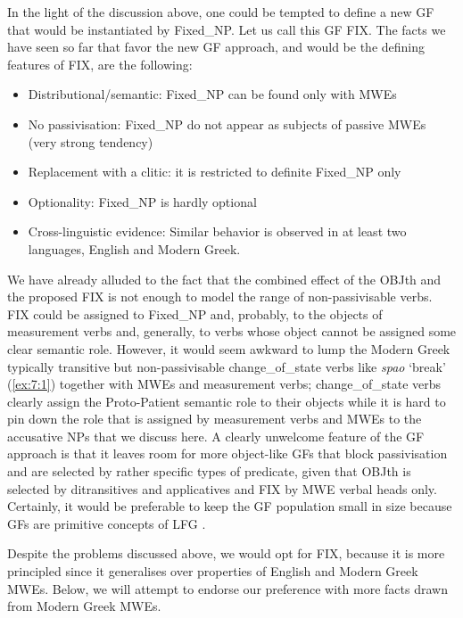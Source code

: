 \documentclass[output=paper]{langsci/langscibook}
\begin{document}
In the light of the discussion above, one could be tempted to define a new GF that would be instantiated by Fixed\_NP. Let us call this GF FIX. The facts we have seen so far that favor the new GF approach, and would be the defining features of FIX, are the following: 

\begin{itemize}
\item Distributional/semantic: Fixed\_NP can be found only with MWEs 
\item No passivisation: Fixed\_NP do not appear as subjects of passive MWEs (very strong tendency)
\item Replacement with a clitic: it is restricted to definite Fixed\_NP only
\item Optionality: Fixed\_NP is hardly optional
\item Cross-linguistic evidence: Similar behavior is observed in at least two languages, English and Modern Greek.
\end{itemize}


We have already alluded to the fact that the combined effect of the OBJth and the proposed FIX is not enough to model the range of non-passivisable verbs. FIX could be assigned to Fixed\_NP and, probably, to the objects of measurement verbs and, generally, to verbs whose object cannot be assigned some clear semantic role. However, it would seem awkward to lump the Modern Greek typically transitive but non-passivisable change\_of\_state verbs like {\normalfont \itshape spao} `break' (\ref{ex:7:1}) together with MWEs and measurement verbs; change\_of\_state verbs clearly assign the Proto-Patient semantic role to their objects while it is hard to pin down the role that is assigned by measurement verbs and MWEs to the accusative NPs that we discuss here.  A clearly unwelcome feature of the GF approach is that it leaves room for more object-like GFs that block passivisation and are selected by rather specific types of predicate, given that OBJth is selected by ditransitives and applicatives and FIX by MWE verbal heads only. Certainly, it would be preferable to keep the GF population small in size because GFs are primitive concepts of LFG \citep{dalrymple2001}. 

Despite the problems discussed above, we would opt for FIX, because it is more principled since it generalises over properties of English and Modern Greek MWEs. Below, we will attempt to endorse our preference with more facts drawn from Modern Greek MWEs.
\end{document}
